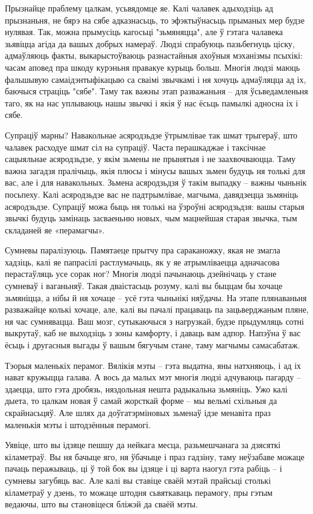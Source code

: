 Прызнайце праблему цалкам, усьвядомце яе. Калі чалавек адыходзіць ад прызнаньня, не бярэ на сябе адказнасьць, то эфэктыўнасьць прыманых мер будзе нулявая. Так, можна прымусіць кагосьці "зьмяняцца", але ў гэтага чалавека зьявіцца агіда да вашых добрых намераў. Людзі спрабуюць пазьбегнуць ціску, адмаўляюць факты, выкарыстоўваюць разнастайныя ахоўныя мэханізмы псыхікі: часам аповед пра шкоду курэньня правакуе курыць больш. Многія людзі маюць фальшывую самаідэнтыфікацыю са сваімі звычкамі і ня хочуць адмаўляцца ад іх, баючыся страціць "сябе". Таму так важны этап разважаньня – для ўсьведамленьня таго, як на нас уплываюць нашы звычкі і якія ў нас ёсьць памылкі адносна іх і сябе.

Супраціў марны? Навакольнае асяродзьдзе ўтрымлівае так шмат трыгераў, што чалавек расходуе шмат сіл на супраціў. Часта перашкаджае і таксічнае сацыяльнае асяродзьдзе, у якім зьмены не прынятыя і не заахвочваюцца. Таму важна загадзя пралічыць, якія плюсы і мінусы вашых зьмен будуць ня толькі для вас, але і для навакольных. Зьмена асяродзьдзя ў такім выпадку – важны чыньнік посьпеху. Калі асяродзьдзе вас не падтрымлівае, магчыма, давядзецца зьмяніць асяродзьдзе. Супраціў можа быць ня толькі на ўзроўні асяродзьдзя: вашы старыя звычкі будуць замінаць засваеньню новых, чым мацнейшая старая звычка, тым складаней яе «перамагчы».

Сумневы паралізуюць. Памятаеце прытчу пра сараканожку, якая не змагла хадзіць, калі яе папрасілі растлумачыць, як у яе атрымліваецца адначасова перастаўляць усе сорак ног? Многія людзі пачынаюць дзейнічаць у стане сумневаў і ваганьняў. Такая дваістасьць розуму, калі вы быццам бы хочаце зьмяніцца, а нібы й ня хочаце – усё гэта чыньнікі няўдачы. На этапе плянаваньня разважайце колькі хочаце, але, калі вы пачалі працаваць па зацьверджаным пляне, ня час сумнявацца. Ваш мозг, сутыкаючыся з нагрузкай, будзе прыдумляць сотні выкрутаў, каб не выходзіць з зоны камфорту, і даваць вам адпор. Напэўна ў вас ёсьць і другасныя выгады ў вашым бягучым стане, таму магчымы самасабатаж.

Тэорыя маленькіх перамог. Вялікія мэты – гэта выдатна, яны натхняюць, і ад іх нават кружыцца галава. А вось да малых мэт многія людзі адчуваюць пагарду – здаецца, што гэта дробязь, няздольная нешта радыкальна зьмяніць. Ужо калі дыета, то цалкам новая ў самай жорсткай форме – мы вельмі схільныя да скрайнасьцяў. Але шлях да доўгатэрміновых зьменаў ідзе менавіта праз маленькія мэты і штодзённыя перамогі.

Уявіце, што вы ідзяце пешшу да нейкага месца, разьмешчанага за дзясяткі кіламетраў. Вы ня бачыце яго, ня ўбачыце і праз гадзіну, таму неўзабаве можаце пачаць перажываць, ці ў той бок вы ідзяце і ці варта наогул гэта рабіць – і сумневы загубяць вас. Але калі вы ставіце сваёй мэтай прайсьці столькі кіламетраў у дзень, то можаце штодня сьвяткаваць перамогу, пры гэтым ведаючы, што вы становіцеся бліжэй да сваёй мэты.


